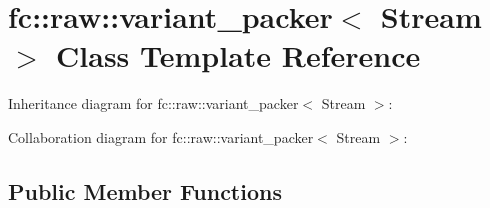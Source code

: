 \hypertarget{classfc_1_1raw_1_1variant__packer}{}\section{fc\+:\+:raw\+:\+:variant\+\_\+packer$<$ Stream $>$ Class Template Reference}
\label{classfc_1_1raw_1_1variant__packer}


Inheritance diagram for fc\+:\+:raw\+:\+:variant\+\_\+packer$<$ Stream $>$\+:


Collaboration diagram for fc\+:\+:raw\+:\+:variant\+\_\+packer$<$ Stream $>$\+:
\subsection*{Public Member Functions}
